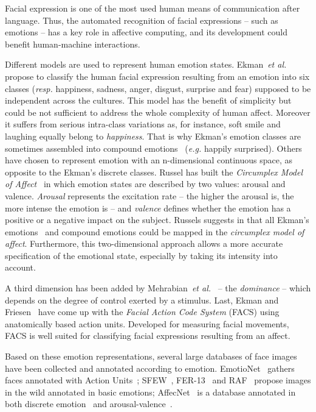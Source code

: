 \documentclass{bmvc2k}
\begin{document}
Facial expression is one of the most used human means of communication after language. Thus, the automated recognition of facial expressions -- such as emotions -- has a key role in affective computing, and its development could benefit human-machine interactions. 

Different models are used to represent human emotion states. Ekman~\textit{et al.}~\cite{ekman_constants_1971} propose to classify the human facial expression resulting from an emotion into six classes (\textit{resp.} happiness, sadness, anger, disgust, surprise and fear) supposed to be independent across the cultures. This model has the benefit of simplicity but could be not sufficient to address the whole complexity of human affect. Moreover it suffers from serious intra-class variations as, for instance, soft smile and laughing equally belong to \textit{happiness}. That is why Ekman's emotion classes are sometimes assembled into compound emotions~\cite{du2014compound} (\textit{e.g.} happily surprised).
Others have chosen to represent emotion with an n-dimensional continuous space, as opposite to the Ekman's discrete classes. Russel has built the \textit{Circumplex Model of Affect}~\cite{russell_circumplex_1980} in which emotion states are described by two values: arousal and valence.
\textit{Arousal} represents the excitation rate -- the higher the arousal is, the more intense the emotion is -- and \textit{valence} defines whether the emotion has a positive or a negative impact on the subject. Russels suggests in \cite{russell_circumplex_1980} that all Ekman's emotions~\cite{ekman_constants_1971} and compound emotions could be mapped in the \textit{circumplex model of affect}. Furthermore, this two-dimensional approach allows a more accurate specification of the emotional state, especially by taking its intensity into account.

A third dimension has been added by Mehrabian~\textit{et al.}~\cite{mehrabian1996pleasure} -- the \textit{dominance} -- which depends on the degree of control exerted by a stimulus. Last, Ekman and Friesen~\cite{ekman_measuring_1976} have come up with the \textit{Facial Action Code System} (FACS) using anatomically based action units. Developed for measuring facial movements, FACS is well suited for classifying facial expressions resulting from an affect. 

Based on these emotion representations, several large databases of face images have been collected and annotated according to emotion. EmotioNet~\cite{benitez-quiroz_emotionet:_2016} gathers faces annotated with Action Units~\cite{ekman_measuring_1976}; SFEW~\cite{dhall_static_2011}, FER-13~\cite{goodfellow_challenges_2013} and RAF~\cite{li_reliable_2017} propose images in the wild annotated in basic emotions; AffecNet~\cite{mollahosseini_affectnet:_2017} is a database annotated in both discrete emotion~\cite{ekman_constants_1971} and arousal-valence~\cite{russell_circumplex_1980}.
\end{document}
